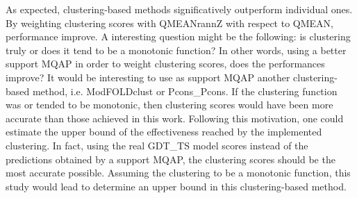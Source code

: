 As expected, clustering-based methods significatively outperform individual ones. By weighting clustering scores with QMEAN\-rannZ with respect to QMEAN, performance improve. A interesting question might be the following: is clustering truly or does it tend to be a monotonic function? In other words, using a better support MQAP in order to weight clustering scores, does the performances improve? It would be interesting to use as support MQAP another clustering-based method, i.e. ModFOLDclust or Pcons\_Pcons. If the clustering function was or tended to be monotonic, then clustering scores would have been more accurate than those achieved in this work. Following this motivation, one could estimate the upper bound of the effectiveness reached by the implemented clustering. In fact, using the real GDT\_TS model scores instead of the predictions obtained by a support MQAP, the clustering scores should be the most accurate possible. Assuming the clustering to be a monotonic function, this study would lead to determine an upper bound in this clustering-based method.

\cleardoublepage

